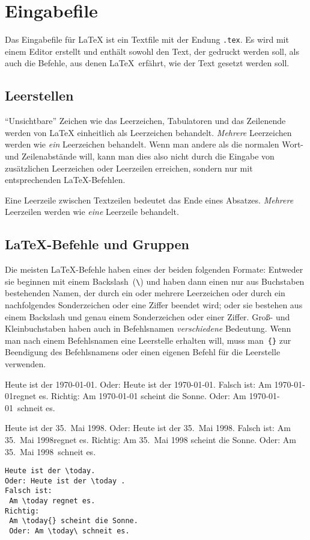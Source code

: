 \section{Eingabefile}
Das Eingabefile für \LaTeX{} ist ein Textfile mit der Endung \verb+.tex+.
Es wird mit einem Editor erstellt und enthält sowohl den Text, der gedruckt
werden soll, als auch die Befehle, aus denen \LaTeX\ erfährt,
wie der Text gesetzt werden soll.


\subsection{Leerstellen}
 
"`Unsichtbare"' Zeichen wie das Leerzeichen, Tabulatoren
und das Zeilenende werden von \LaTeX{}
einheitlich als Leerzeichen behandelt.  \emph{Mehrere}
Leerzeichen werden wie \emph{ein} Leerzeichen behandelt.   
Wenn man andere als die normalen Wort- und Zeilenabstände
will, kann man dies also nicht durch die Eingabe von
zusätzlichen Leerzeichen oder Leerzeilen erreichen, sondern
nur mit entsprechenden \LaTeX-Befehlen.

Eine Leerzeile zwischen Textzeilen bedeutet das Ende eines 
Absatzes.  \emph{Mehrere} Leerzeilen werden wie \emph{eine}
Leerzeile behandelt.
 
 
\subsection{\LaTeX-Befehle und Gruppen}
 
Die meisten \LaTeX-Befehle haben eines der beiden folgenden
Formate: Entweder sie beginnen mit einem Backslash~(\verb|\|)
und haben dann einen nur aus Buchstaben bestehenden Namen, der
durch ein oder mehrere Leerzeichen oder durch ein nachfolgendes
Sonderzeichen oder eine Ziffer beendet wird; oder sie bestehen
aus einem Backslash und genau einem Sonderzeichen oder einer
Ziffer.
Groß- und Kleinbuchstaben haben auch in Befehlsnamen
\emph{verschiedene} Bedeutung.
Wenn man nach einem Befehlsnamen eine Leerstelle erhalten will,
muss man~\verb|{}| zur Beendigung des Befehlsnamens oder einen
eigenen Befehl für die Leerstelle verwenden.

\begin{LTXexample}
Heute ist der \today.
Oder: Heute ist der \today .
Falsch ist:
 Am \today regnet es.
Richtig:
 Am \today{} scheint die Sonne.
 Oder: Am \today\ schneit es.
\end{LTXexample}

\exa
\renewcommand{\today}{35.~Mai 1998}  %
Heute ist der \today.
Oder: Heute ist der \today .
Falsch ist: Am \today regnet es.
Richtig: Am \today{} scheint die Sonne.
Oder: Am \today\ schneit es.
\exb
\begin{verbatim}
Heute ist der \today.
Oder: Heute ist der \today .
Falsch ist:
 Am \today regnet es.
Richtig:
 Am \today{} scheint die Sonne.
 Oder: Am \today\ schneit es.
\end{verbatim}
\exc
 
